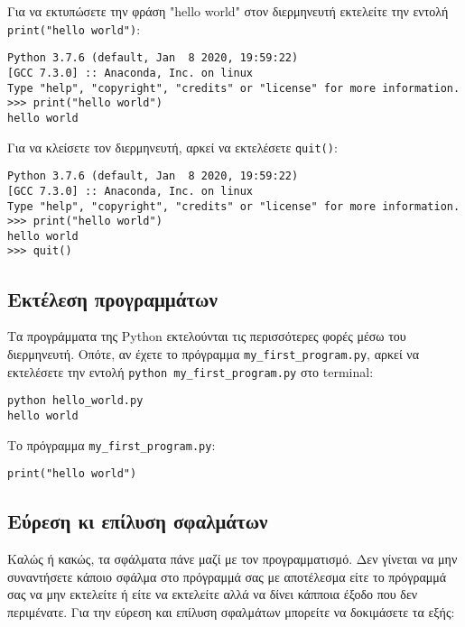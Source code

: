 \documentclass[12pt]{extreport}
\begin{document}
Για να εκτυπώσετε την φράση "hello world" στον διερμηνευτή εκτελείτε  την εντολή \lstinline{print("hello world")}:
\begin{lstlisting}[numbers=none]
Python 3.7.6 (default, Jan  8 2020, 19:59:22) 
[GCC 7.3.0] :: Anaconda, Inc. on linux
Type "help", "copyright", "credits" or "license" for more information.
>>> print("hello world")
hello world
\end{lstlisting}

Για να κλείσετε τον διερμηνευτή, αρκεί να εκτελέσετε \lstinline{quit()}:

\begin{lstlisting}[numbers=none]
Python 3.7.6 (default, Jan  8 2020, 19:59:22) 
[GCC 7.3.0] :: Anaconda, Inc. on linux
Type "help", "copyright", "credits" or "license" for more information.
>>> print("hello world")
hello world
>>> quit()
\end{lstlisting}

\subsection{Εκτέλεση προγραμμάτων}

Τα προγράμματα της Python εκτελούνται τις περισσότερες φορές μέσω του διερμηνευτή. Οπότε, αν έχετε το πρόγραμμα \lstinline{my_first_program.py}, αρκεί να εκτελέσετε την εντολή \lstinline{python my_first_program.py} στο terminal:

\begin{lstlisting}[numbers=none]
python hello_world.py
hello world    
\end{lstlisting}

Το πρόγραμμα \lstinline{my_first_program.py}:
\begin{lstlisting}
print("hello world")
\end{lstlisting}

\newpage
\subsection{Εύρεση κι επίλυση σφαλμάτων}

Καλώς ή κακώς, τα σφάλματα πάνε μαζί με τον προγραμματισμό. Δεν γίνεται να μην συναντήσετε κάποιο σφάλμα στο πρόγραμμά σας με αποτέλεσμα είτε το πρόγραμμά σας να μην εκτελείτε ή είτε να εκτελείτε αλλά να δίνει κάπποια έξοδο που δεν περιμένατε. Για την εύρεση και επίλυση σφαλμάτων μπορείτε να δοκιμάσετε τα εξής:
\end{document}

